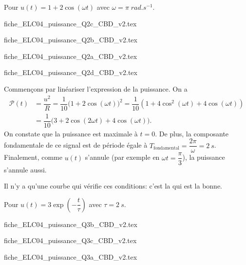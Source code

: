 
\begin{enonce}
Pour $u(t)=1+2\cos(\omega t)$ avec $\omega = \pi \;\si{rad.s^{-1}}$.

\begin{listeQCM2Colonnes}
\item {fiche_ELC04_puissance_Q2c_CBD_v2.tex}
\item {fiche_ELC04_puissance_Q2b_CBD_v2.tex}
\item {fiche_ELC04_puissance_Q2a_CBD_v2.tex}
\item {fiche_ELC04_puissance_Q2d_CBD_v2.tex}
\end{listeQCM2Colonnes}
\medskip
\end{enonce}

\reponse{\reponseC{}} 

\begin{corrige}
Commençons par linéariser l'expression de la puissance. On a 
\begin{align*}
\mathcal{P}(t) & =\dfrac{u^{2}}{R}=\dfrac{1}{10}\big(1+2\cos(\omega t)\big)^{2}=\dfrac{1}{10}\left(1+4\cos^{2}(\omega t)+4\cos(\omega t)\right)\\
 & =\dfrac{1}{10}\big(3+2\cos(2\omega t)+4\cos(\omega t)\big).
\end{align*}
On constate que la puissance est maximale à $t=0$. De plus, la composante fondamentale
de ce signal est de période égale à $T_{\text{fondamental}}=\dfrac{2\pi}{\omega}=\SI{2}{s}$.
Finalement, comme $u(t)$ s'annule (par exemple en $\omega t=\dfrac{\pi}{3}$),
la puissance s'annule aussi. 

Il n'y a qu'une courbe qui vérifie ces conditions: c'est la \reponseC{} qui est la bonne.
\end{corrige}



\newpage



\begin{enonce}
Pour $u(t)=3\exp \left(-\dfrac{t}{\tau}\right)$ avec $\tau=\SI{2}{s}$.\\

\begin{listeQCM2Colonnes}
\item {fiche_ELC04_puissance_Q3b_CBD_v2.tex}
\item {fiche_ELC04_puissance_Q3c_CBD_v2.tex}
\item {fiche_ELC04_puissance_Q3a_CBD_v2.tex}
\end{listeQCM2Colonnes}
\medskip
\end{enonce}

